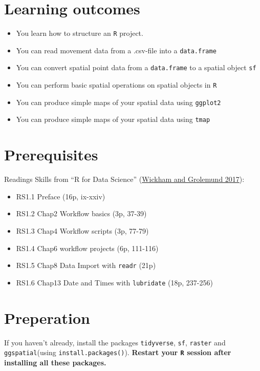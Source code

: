 \documentclass[
]{book}
\providecommand{\tightlist}{%
  \setlength{\itemsep}{0pt}\setlength{\parskip}{0pt}}
\begin{document}
\hypertarget{learning-outcomes}{%
\section{Learning outcomes}\label{learning-outcomes}}

\begin{itemize}
\tightlist
\item
  You learn how to structure an \texttt{R} project.
\item
  You can read movement data from a .csv-file into a \texttt{data.frame}
\item
  You can convert spatial point data from a \texttt{data.frame} to a spatial object \texttt{sf}
\item
  You can perform basic spatial operations on spatial objects in \texttt{R}
\item
  You can produce simple maps of your spatial data using \texttt{ggplot2}
\item
  You can produce simple maps of your spatial data using \texttt{tmap}
\end{itemize}

\hypertarget{prerequisites}{%
\section{Prerequisites}\label{prerequisites}}

Readings Skills from ``R for Data Science'' (\protect\hyperlink{ref-wickham2017}{Wickham and Grolemund 2017}):

\begin{itemize}
\tightlist
\item
  RS1.1 Preface (16p, ix-xxiv)
\item
  RS1.2 Chap2 Workflow basics (3p, 37-39)
\item
  RS1.3 Chap4 Workflow scripts (3p, 77-79)
\item
  RS1.4 Chap6 workflow projects (6p, 111-116)
\item
  RS1.5 Chap8 Data Import with \texttt{readr} (21p)
\item
  RS1.6 Chap13 Date and Times with \texttt{lubridate} (18p, 237-256)
\end{itemize}

\hypertarget{preperation}{%
\section{Preperation}\label{preperation}}

If you haven't already, install the packages \texttt{tidyverse}, \texttt{sf}, \texttt{raster} and \texttt{ggspatial}(using \texttt{install.packages()}). \textbf{Restart your \texttt{R} session after installing all these packages.}
\end{document}
